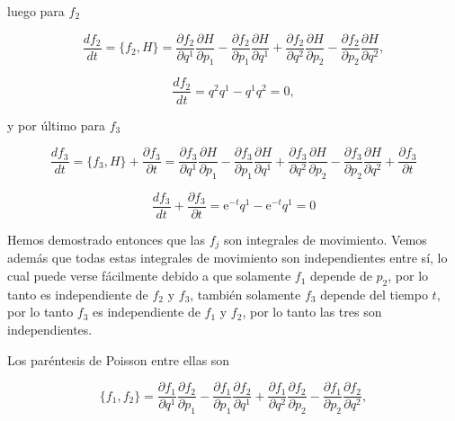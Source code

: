 \documentclass[a4paper,10pt]{article}
\numberwithin{equation}{section}
\newcommand{\euler}{\mathrm{e}}
\begin{document}
luego para $f_2$

\begin{equation}
 \frac{df_2}{dt} = \{f_2,H\} = \frac{\partial f_2}{\partial q^1}\frac{\partial H}{\partial p_1} - 
 \frac{\partial f_2}{\partial p_1}\frac{\partial H}{\partial q^1} +  \frac{\partial f_2}{\partial q^2}\frac{\partial H}{\partial p_2} - 
 \frac{\partial f_2}{\partial p_2}\frac{\partial H}{\partial q^2},
\end{equation}

\begin{equation}
 \frac{df_2}{dt} = q^2q^1 - q^1q^2 = 0,
\end{equation}

y por último para $f_3$

\begin{equation}
\frac{df_3}{dt} = \{f_3,H\} + \frac{\partial f_3}{\partial t} = \frac{\partial f_3}{\partial q^1}\frac{\partial H}{\partial p_1} - 
 \frac{\partial f_3}{\partial p_1}\frac{\partial H}{\partial q^1} +  \frac{\partial f_3}{\partial q^2}\frac{\partial H}{\partial p_2} - 
 \frac{\partial f_3}{\partial p_2}\frac{\partial H}{\partial q^2} + \frac{\partial f_3}{\partial t} 
\end{equation}


\begin{equation}
 \frac{df_3}{dt} + \frac{\partial f_3}{\partial t} = \euler^{-t}q^1 -\euler^{-t}q^1 = 0
\end{equation}

Hemos demostrado entonces que las $f_j$ son integrales de movimiento. Vemos además que 
todas estas integrales de movimiento son independientes entre sí, lo cual puede verse 
fácilmente debido a que solamente $f_1$ depende de $p_2$, por lo tanto es independiente 
de $f_2$ y $f_3$, también solamente $f_3$ depende del tiempo $t$, por lo tanto 
$f_3$ es independiente de $f_1$ y $f_2$, por lo tanto las tres son independientes.

\vspace{.3cm}

Los paréntesis de Poisson entre ellas son

\begin{equation}
 \{f_1,f_2\} = \frac{\partial f_1}{\partial q^1}\frac{\partial f_2}{\partial p_1} - 
 \frac{\partial f_1}{\partial p_1}\frac{\partial f_2}{\partial q^1} +  \frac{\partial f_1}{\partial q^2}\frac{\partial f_2}{\partial p_2} - 
 \frac{\partial f_1}{\partial p_2}\frac{\partial f_2}{\partial q^2},
\end{equation}
\end{document}
